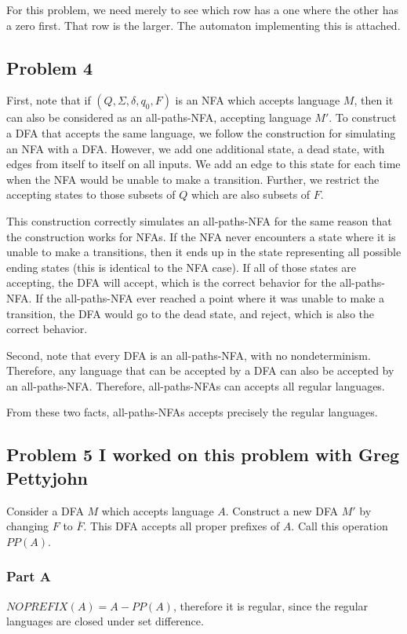 \documentclass[12pt]
{article}
\newcommand{\qed}{\nobreak \ifvmode \relax \else
      \ifdim\lastskip<1.5em \hskip-\lastskip
      \hskip1.5em plus0em minus0.5em \fi \nobreak
      \vrule height0.75em width0.5em depth0.25em\fi}
\begin{document}
For this problem, we need merely to see which row has a one where the
other has a zero first.  That row is the larger.  The automaton
implementing this is attached.  

\subsection*{Problem 4}

First, note that if $(Q,\Sigma,\delta,q_0,F)$ is an NFA which accepts
language $M$, then it can also be considered as an all-paths-NFA,
accepting language $M'$.  To construct a DFA that accepts the same
language, we follow the construction for simulating an NFA with a
DFA.  However, we add one additional state, a dead state, with edges
from itself to itself on all inputs.  We add an edge to this state for
each time when the NFA would be unable to make a transition.  Further,
we restrict the accepting states to those subsets of $Q$ which are
also subsets of $F$.  

This construction correctly simulates an all-paths-NFA for the same
reason that the construction works for NFAs.  If the NFA never
encounters a state where it is unable to make a transitions, then it
ends up in the state representing all possible ending states (this is
identical to the NFA case).  If all of those states are accepting, the
DFA will accept, which is the correct behavior for the
all-paths-NFA. If the all-paths-NFA ever reached a point where it was
unable to make a transition, the DFA would go to the dead state, and
reject, which is also the correct behavior.  

Second, note that every DFA is an all-paths-NFA, with no
nondeterminism.  Therefore, any language that can be accepted by a DFA
can also be accepted by an all-paths-NFA.  Therefore, all-paths-NFAs
can accepts all regular languages.  

From these two facts, all-paths-NFAs accepts precisely the regular
languages.  \qed

\subsection*{Problem 5 \small{I worked on this problem with Greg Pettyjohn}}
Consider a DFA $M$ which accepts language $A$.  Construct a new DFA
$M'$ by changing $F$ to $\overline{F}$.  This DFA accepts all proper
prefixes of $A$.  Call this operation $PP(A)$.  

\subsubsection*{Part A}
$NOPREFIX(A) = A - PP(A)$, therefore it is regular, since the regular
languages are closed under set difference.  
\end{document}

